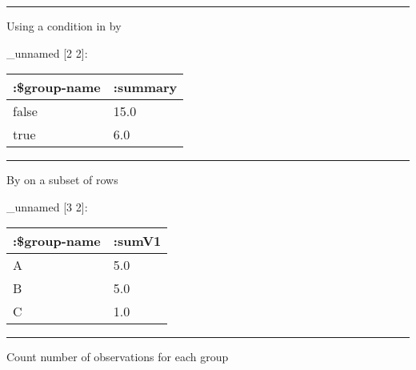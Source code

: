 \documentclass[]{article}
\newenvironment{Shaded}{\begin{snugshade}}{\end{snugshade}}
\newcommand{\AttributeTok}[1]{\textcolor[rgb]{0.77,0.63,0.00}{#1}}
\newcommand{\DecValTok}[1]{\textcolor[rgb]{0.00,0.00,0.81}{#1}}
\newcommand{\KeywordTok}[1]{\textcolor[rgb]{0.13,0.29,0.53}{\textbf{#1}}}
\newcommand{\NormalTok}[1]{#1}
\newcommand{\StringTok}[1]{\textcolor[rgb]{0.31,0.60,0.02}{#1}}
\newcommand{\VariableTok}[1]{\textcolor[rgb]{0.00,0.00,0.00}{#1}}
\begin{document}
\begin{center}\rule{0.5\linewidth}{0.5pt}\end{center}

Using a condition in by

\begin{Shaded}
\end{Shaded}

\_unnamed {[}2 2{]}:

\begin{longtable}[]{@{}ll@{}}
\toprule
:\$group-name & :summary\tabularnewline
\midrule
\endhead
false & 15.0\tabularnewline
true & 6.0\tabularnewline
\bottomrule
\end{longtable}

\begin{center}\rule{0.5\linewidth}{0.5pt}\end{center}

By on a subset of rows

\begin{Shaded}
\end{Shaded}

\_unnamed {[}3 2{]}:

\begin{longtable}[]{@{}ll@{}}
\toprule
:\$group-name & :sumV1\tabularnewline
\midrule
\endhead
A & 5.0\tabularnewline
B & 5.0\tabularnewline
C & 1.0\tabularnewline
\bottomrule
\end{longtable}

\begin{center}\rule{0.5\linewidth}{0.5pt}\end{center}

Count number of observations for each group
\end{document}
